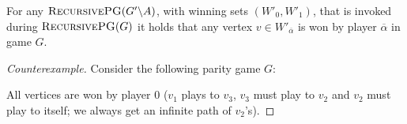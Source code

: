 \begin{conjecture}[Disproven]
	\label{con_opponent_a_always_wins}
	For any $\textsc{RecursivePG}(G'\backslash A)$, with winning sets $(W'_0,W'_1)$, that is invoked during $\textsc{RecursivePG}(G)$ it holds that any vertex $v \in W'_{\overline{\alpha}}$ is won by player $\overline{\alpha}$ in game $G$.
	\begin{proof}[Counterexample]
		Consider the following parity game $G$:
		\begin{center}
		\end{center}
		
		All vertices are won by player $0$ ($v_1$ plays to $v_3$, $v_3$ must play to $v_2$ and $v_2$ must play to itself; we always get an infinite path of $v_2$'s).
		

\end{proof}
\end{conjecture}
